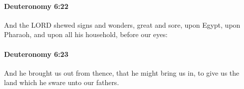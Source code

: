 		\paragraph{Deuteronomy 6:22} %
			\label{DEUTERONOMY-6-22}

			And the LORD shewed signs and wonders, great and sore, upon Egypt, upon Pharaoh, and upon all his household, before our eyes:


		\paragraph{Deuteronomy 6:23} %
			\label{DEUTERONOMY-6-23}

			And he brought us out from thence, that he might bring us in, to give us the land which he sware unto our fathers.


